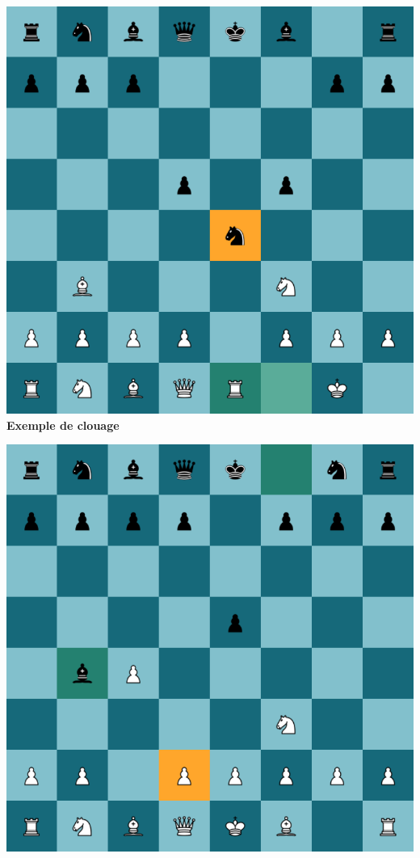 \documentclass{article}
\begin{document}
 \noindent
 \begin{minipage}{0.48\textwidth}
     \centering
     \includegraphics[width=\textwidth, height=\textwidth]{clouage1.png}
     \vspace{0.5cm}
    \textbf{Exemple de clouage}
 \end{minipage}
 \hfill
 \begin{minipage}{0.48\textwidth}
     \centering
     \includegraphics[width=\textwidth, height=\textwidth]{clouage2.png}
     \vspace{0.5cm}
 \end{minipage}
\end{document}

